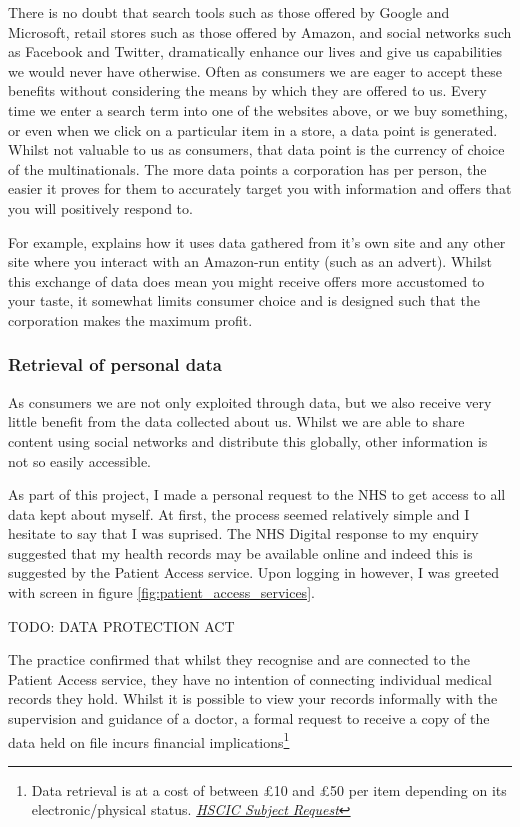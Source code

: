 There is no doubt that search tools such as those offered by Google and Microsoft, retail stores such as those offered by Amazon, and social networks such as Facebook and Twitter, dramatically enhance our lives and give us capabilities we would never have otherwise. Often as consumers we are eager to accept these benefits without considering the means by which they are offered to us. Every time we enter a search term into one of the websites above, or we buy something, or even when we click on a particular item in a store, a data point is generated. Whilst not valuable to us as consumers, that data point is the currency of choice of the multinationals. The more data points a corporation has per person, the easier it proves for them to accurately target you with information and offers that you will positively respond to.

For example, \cite{amazoninterestads:2017:online} explains how it uses data gathered from it's own site and any other site where you interact with an Amazon-run entity (such as an advert). Whilst this exchange of data does mean you might receive offers more accustomed to your taste, it somewhat limits consumer choice and is designed such that the corporation makes the maximum profit.

\subsubsection{Retrieval of personal data}

As consumers we are not only exploited through data, but we also receive very little benefit from the data collected about us. Whilst we are able to share content using social networks and distribute this globally, other information is not so easily accessible.

As part of this project, I made a personal request to the NHS to get access to all data kept about myself. At first, the process seemed relatively simple and I hesitate to say that I was suprised. The NHS Digital response to my enquiry suggested that my health records may be available online and indeed this is suggested by the Patient Access service. Upon logging in however, I was greeted with screen in figure \ref{fig:patient_access_services}.

TODO: DATA PROTECTION ACT



The practice confirmed that whilst they recognise and are connected to the Patient Access service, they have no intention of connecting individual medical records they hold. Whilst it is possible to view your records informally with the supervision and guidance of a doctor, a formal request to receive a copy of the data held on file incurs financial implications\footnote{Data retrieval is at a cost of between £10 and £50 per item depending on its electronic/physical status. \href{https://www.gov.uk/government/publications/subject-access-request}{\textit{HSCIC Subject Request}}}

